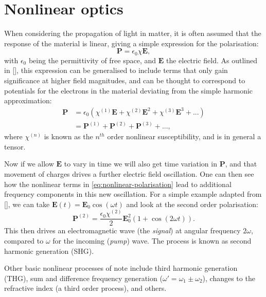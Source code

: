 \documentclass[12pt,a4paper]{article}
\newcommand{\citein}[1]{[\citen{#1}]}
\begin{document}
\section{Nonlinear optics}
\label{section:nonlinear-optics}
When considering the propagation of light in matter, it is often assumed that the response of the material is linear\cite{jacksonClassicalElectrodynamics1999}, giving a simple expression for the polarisation:
\begin{equation}
	\label{eq:linear-polarisation}
	\bm{P}=\epsilon_0\chi\bm{E},
\end{equation}
with $\epsilon_0$ being the permittivity of free space, and $\bm{E}$ the electric field. As outlined in \citein{boydNonlinearOptics2008}, this expression can be generalised to include terms that only gain significance at higher field magnitudes, and can be thought to correspond to potentials for the electrons in the material deviating from the simple harmonic approximation:
\begin{align}
	\label{eq:nonlinear-polarisation}
	\bm{P}&=\epsilon_0(\chi^{(1)}\bm{E}+\chi^{(2)}\bm{E}^2+\chi^{(3)}\bm{E}^3+...)\\
	&=\bm{P}^{(1)}+\bm{P}^{(2)}+\bm{P}^{(3)}+...,
\end{align}
where $\chi^{(n)}$ is known as the $n^{th}$ order nonlinear susceptibility, and is in general a tensor.

Now if we allow $\bm{E}$ to vary in time we will also get time variation in $\bm{P}$, and that movement of charges drives a further electric field oscillation. One can then see how the nonlinear terms in \eqref{eq:nonlinear-polarisation} lead to additional frequency components in this new oscillation. For a simple example adapted from \citein{boydNonlinearOptics2008}, we can take $\bm{E}(t)=\bm{E}_0\cos(\omega t)$ and look at the second order polarisation:
\begin{equation}
	\label{eq:example-polarisation}
	\bm{P}^{(2)}=\frac{\epsilon_0\chi^{(2)}}{2}\bm{E}_0^2\left(1+\cos(2\omega t)\right).
\end{equation}
This then drives an electromagnetic wave (the \emph{signal}) at angular frequency $2\omega$, compared to $\omega$ for the incoming (\emph{pump}) wave. The process is known as second harmonic generation (SHG).

Other basic nonlinear processes of note include third harmonic generation (THG), sum and difference frequency generation ($\omega'=\omega_1\pm\omega_2$), changes to the refractive index (a third order process), and others\cite{boydNonlinearOptics2008}.
\end{document}
